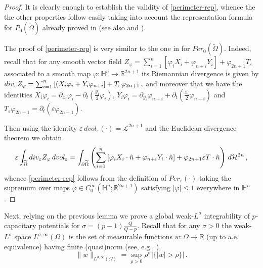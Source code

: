 \documentclass[10pt]{amsart}
\numberwithin{equation}{section}
\theoremstyle{definition}
\newcommand{\eps}{\varepsilon}
\newcommand{\He}{\mathbb{H}}
\newcommand{\eT}{T_{\eps}}
\begin{document}
\begin{proof}
It is clearly enough to establish the validity of \eqref{perimeter-rep}, whence the the other properties follow
easily taking into account the representation formula for $P_0(\widetilde{\Omega})$ already proved in \cite[Section 3]{CapDanGar2} (see also \cite{MonSeCa} and \cite[Section 7]{FraSeSeCa}).

The proof of \eqref{perimeter-rep} is very similar to the one in \cite[Section 3]{CapDanGar2} for $Per_0(\widetilde{\Omega})$. Indeed, recall that   
 for any smooth vector field $Z_\varphi=\sum_{i=1}^n \left[ \varphi_i X_i + \varphi_{n+i} Y_i \right]+ \varphi_{2n+1} T_\varepsilon$ associated to a smooth map $\varphi:\He^n \to \mathbb{R}^{2n+1}$  its Riemannian divergence is given by ${\rm div}_{\eps} Z_\varphi = \sum_{i=1}^{n}\left[(X_i \varphi_i + Y_i \varphi_{n+i}\right] + \eT  \varphi_{2n+1} \, ,$ and moreover that we have the identities 
 $X_i \varphi_i=\partial_{x_i} \varphi_i-\partial_t (\frac{y_i}{2} \varphi_i)$, $Y_i \varphi_i=\partial_{y_i} \varphi_{n+i}+\partial_t (\frac{x_i}{2} \varphi_{n+i})$ and $T_\varepsilon \varphi_{2n+1}=\partial_t (\varepsilon \varphi_{2n+1})$.
 
 Then using the identity $\varepsilon \, dvol_\varepsilon (\cdot)=\mathcal{L}^{2n+1}$ and the Euclidean divergence theorem we obtain
\[  \varepsilon \int_{\widetilde{\Omega} } {\rm div}_{\eps} Z_\varphi \, dvol_\varepsilon= \int_{\partial \widetilde{\Omega}} \left( \sum_{i=1}^n \left[  \varphi_i X_i \cdot \hat{n}  +\varphi_{n+i} Y_i \cdot \hat{n}  \right] +\varphi_{2n+1} \varepsilon T \cdot \hat{n}  \right) \,   d\mathcal{H}^{2n} \, ,\]
whence \eqref{perimeter-rep} follows from the definition of $Per_\varepsilon(\cdot)$ taking the supremum over maps $\varphi \in C_0^\infty(\He^n;\mathbb{R}^{2n+1})$ satisfying $|\varphi| \leq 1$ everywhere in $\He^n$. 


\end{proof}

Next, relying on the previous lemma we prove a global weak-$L^\sigma$ integrability of $p$-capacitary potentials for $\sigma=(p-1) \frac{Q}{Q-p}$. Recall that for any $\sigma>0$ the weak-$L^\sigma$ space $L^{\sigma,\infty}(\Omega)$ is the set of measurable functions $w: \Omega \to \mathbb{R}$ (up to a.e. equivalence) having finite (quasi)norm (see, e.g., \cite{Graf}), 
\begin{equation}
\label{weak-Lp-norm}
\| w \|_{L^{\sigma,\infty}(\Omega)}=\sup_{ \rho>0}\rho^\sigma |\{|w|>\rho \}| \, .	
\end{equation}
\end{document}

